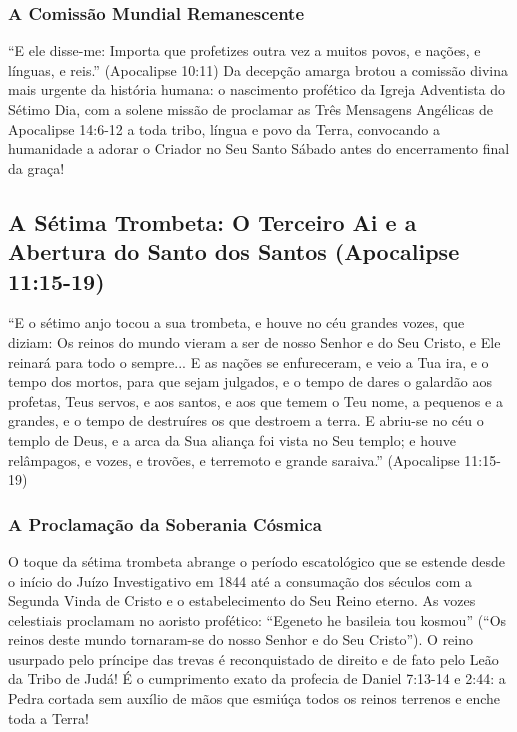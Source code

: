 \subsubsection*{A Comissão Mundial Remanescente}
``E ele disse-me: Importa que profetizes outra vez a muitos povos, e nações, e línguas, e reis.'' (Apocalipse 10:11)
Da decepção amarga brotou a comissão divina mais urgente da história humana: o nascimento profético da Igreja Adventista do Sétimo Dia, com a solene missão de proclamar as Três Mensagens Angélicas de Apocalipse 14:6-12 a toda tribo, língua e povo da Terra, convocando a humanidade a adorar o Criador no Seu Santo Sábado antes do encerramento final da graça!



\subsection{A Sétima Trombeta: O Terceiro Ai e a Abertura do Santo dos Santos (Apocalipse 11:15-19)}


``E o sétimo anjo tocou a sua trombeta, e houve no céu grandes vozes, que diziam: Os reinos do mundo vieram a ser de nosso Senhor e do Seu Cristo, e Ele reinará para todo o sempre... E as nações se enfureceram, e veio a Tua ira, e o tempo dos mortos, para que sejam julgados, e o tempo de dares o galardão aos profetas, Teus servos, e aos santos, e aos que temem o Teu nome, a pequenos e a grandes, e o tempo de destruíres os que destroem a terra. E abriu-se no céu o templo de Deus, e a arca da Sua aliança foi vista no Seu templo; e houve relâmpagos, e vozes, e trovões, e terremoto e grande saraiva.'' (Apocalipse 11:15-19)


\subsubsection*{A Proclamação da Soberania Cósmica}
O toque da sétima trombeta abrange o período escatológico que se estende desde o início do Juízo Investigativo em 1844 até a consumação dos séculos com a Segunda Vinda de Cristo e o estabelecimento do Seu Reino eterno.
As vozes celestiais proclamam no aoristo profético: ``Egeneto he basileia tou kosmou'' (``Os reinos deste mundo tornaram-se do nosso Senhor e do Seu Cristo''). O reino usurpado pelo príncipe das trevas é reconquistado de direito e de fato pelo Leão da Tribo de Judá! É o cumprimento exato da profecia de Daniel 7:13-14 e 2:44: a Pedra cortada sem auxílio de mãos que esmiúça todos os reinos terrenos e enche toda a Terra!


